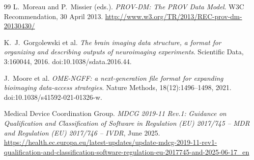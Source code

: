 \documentclass[11pt,a4paper]{article}
\begin{document}
\begin{thebibliography}{99}
L.~Moreau and P.~Missier (eds.).
\emph{PROV-DM: The PROV Data Model}. W3C Recommendation, 30 April 2013.
\url{http://www.w3.org/TR/2013/REC-prov-dm-20130430/}

K.~J.~Gorgolewski et al.
\emph{The brain imaging data structure, a format for organizing and describing outputs of
neuroimaging experiments}.
Scientific Data, 3:160044, 2016. doi:10.1038/sdata.2016.44.

J.~Moore et al.
\emph{OME-NGFF: a next-generation file format for expanding bioimaging data-access
strategies}.
Nature Methods, 18(12):1496--1498, 2021. doi:10.1038/s41592-021-01326-w.

Medical Device Coordination Group.
\emph{MDCG 2019-11 Rev.1: Guidance on Qualification and Classification of Software in
Regulation (EU) 2017/745 -- MDR and Regulation (EU) 2017/746 -- IVDR}, June 2025.
\url{https://health.ec.europa.eu/latest-updates/update-mdcg-2019-11-rev1-qualification-and-classification-software-regulation-eu-2017745-and-2025-06-17_en}

\end{thebibliography}
\end{document}
